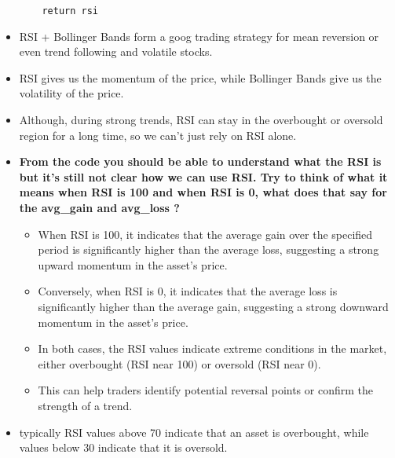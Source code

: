 \documentclass{article}
\begin{document}
\begin{itemize}
\begin{lstlisting}
    return rsi
    \end{lstlisting}
    \item RSI + Bollinger Bands form a goog trading strategy for mean reversion or even trend following and volatile stocks.
    \item RSI gives us the momentum of the price, while Bollinger Bands give us the volatility of the price.
    \item Although, during strong trends, RSI can stay in the overbought or oversold region for a long time, so we can't just rely on RSI alone.
    \item \textbf{From the code you should be able to understand what the RSI is but it's still not clear how we can use RSI. Try to think of what it means when RSI is 100 and when RSI is 0, what does that say for the avg\_gain and avg\_loss ?}
    \begin{itemize}
        \item When RSI is 100, it indicates that the average gain over the specified period is significantly higher than the average loss, suggesting a strong upward momentum in the asset's price.
        \item Conversely, when RSI is 0, it indicates that the average loss is significantly higher than the average gain, suggesting a strong downward momentum in the asset's price.
        \item In both cases, the RSI values indicate extreme conditions in the market, either overbought (RSI near 100) or oversold (RSI near 0).
        \item This can help traders identify potential reversal points or confirm the strength of a trend.
    \end{itemize}
    \item typically RSI values above 70 indicate that an asset is overbought, while values below 30 indicate that it is oversold.
\end{itemize}
\end{document}
